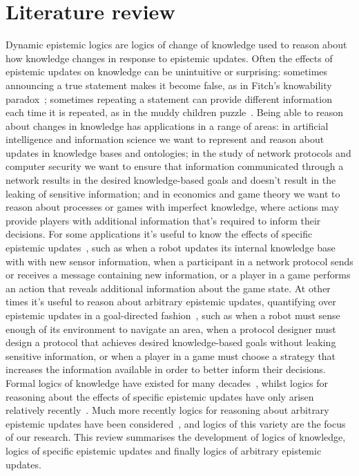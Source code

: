 \chapter{Literature review}\label{literature}

Dynamic epistemic logics are logics of change of knowledge used to reason about how knowledge changes in response to epistemic updates.
Often the effects of epistemic updates on knowledge can be unintuitive or surprising: sometimes announcing a true statement makes it become false, as in Fitch's knowability paradox~\cite{fitch:1963}; sometimes repeating a statement can provide different information each time it is repeated, as in the muddy children puzzle~\cite{barwise:1981, vanditmarsch:2007}. 
Being able to reason about changes in knowledge has applications in a range of areas:
in artificial intelligence and information science we want to represent and reason about updates in knowledge bases and ontologies;
in the study of network protocols and computer security we want to ensure that information communicated through a network results in the desired knowledge-based goals and doesn't result in the leaking of sensitive information; and
in economics and game theory we want to reason about processes or games with imperfect knowledge, where actions may provide players with additional information that's required to inform their decisions.
For some applications it's useful to know the effects of specific epistemic updates~\cite{plaza:1989,baltag:1998}, such as when a robot updates its internal knowledge base with with new sensor information, when a participant in a network protocol sends or receives a message containing new information, or a player in a game performs an action that reveals additional information about the game state.
At other times it's useful to reason about arbitrary epistemic updates, quantifying over epistemic updates in a goal-directed fashion~\cite{balbiani:2007,agotnes:2010,vanditmarsch:2009}, such as when a robot must sense enough of its environment to navigate an area, when a protocol designer must design a protocol that achieves desired knowledge-based goals without leaking sensitive information, or when a player in a game must choose a strategy that increases the information available in order to better inform their decisions.
Formal logics of knowledge have existed for many decades~\cite{vonwright:1951,hintikka:1957,hintikka:1961,hintikka:1962}, whilst logics for reasoning about the effects of specific epistemic updates have only arisen relatively recently~\cite{plaza:1989,gerbrandy:1997,baltag:1998}. 
Much more recently logics for reasoning about arbitrary epistemic updates have been considered~\cite{balbiani:2007,vanditmarsch:2009,agotnes:2010}, and logics of this variety are the focus of our research.
This review summarises the development of logics of knowledge, logics of specific epistemic updates and finally logics of arbitrary epistemic updates.  

